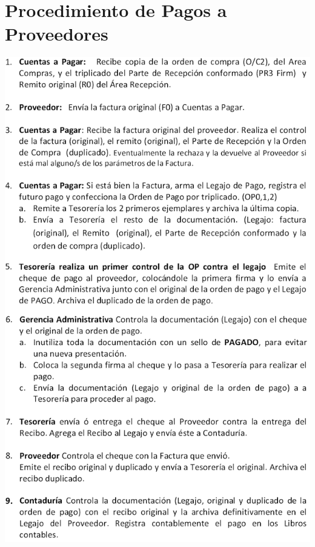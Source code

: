 \section{Procedimiento de Pagos a Proveedores}
\begin{center}
 \includegraphics[scale=0.7,keepaspectratio=true]{./Circuitos-Teoricos/Pago-a-Proveedores/Images/procedimiento-pago-a-proveedores.png}
\end{center}

